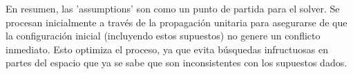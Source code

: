 En resumen, las 'assumptions' son como un punto de partida para el solver. Se procesan inicialmente a través de la propagación unitaria para asegurarse de que la configuración inicial (incluyendo estos supuestos) no genere un conflicto inmediato. Esto optimiza el proceso, ya que evita búsquedas infructuosas en partes del espacio que ya se sabe que son inconsistentes con los supuestos dados.


